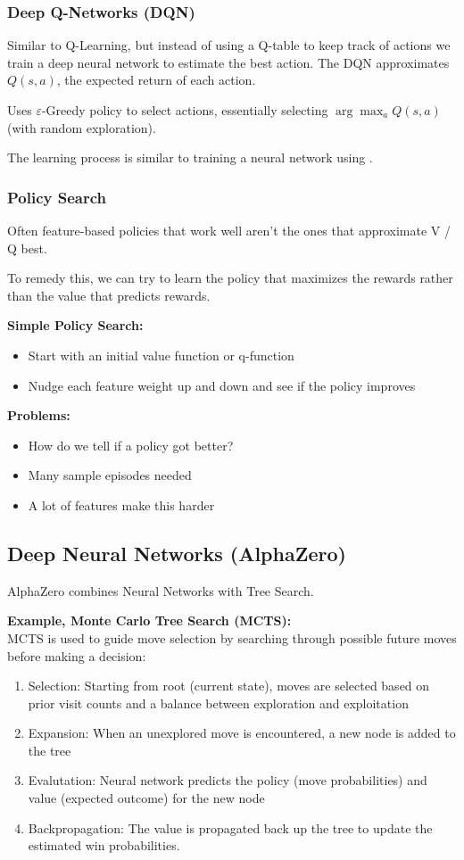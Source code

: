 \documentclass[
../EiKI_Summary.tex,
]
{subfiles}
\begin{document}
\subsubsection{Deep Q-Networks (DQN)}
Similar to Q-Learning, but instead of using a Q-table to keep track of actions we train a deep neural network to estimate the best action. The DQN approximates $Q(s,a)$, the expected return of each action.

Uses $\varepsilon$-Greedy policy to select actions, essentially selecting $\arg \max_a Q(s,a)$ (with random exploration). 

The learning process is similar to training a neural network using .


\subsubsection{Policy Search}
Often feature-based policies that work well aren't the ones that approximate V / Q best. 

To remedy this, we can try to learn the policy that maximizes the rewards rather than the value that predicts rewards.

\textbf{Simple Policy Search:}
\begin{itemize}
    \item Start with an initial value function or q-function
    \item Nudge each feature weight up and down and see if the policy improves
\end{itemize}

\textbf{Problems:}
\begin{itemize}
    \item How do we tell if a policy got better?
    \item Many sample episodes needed
    \item A lot of features make this harder
\end{itemize}

\subsection{Deep Neural Networks (AlphaZero)}
AlphaZero combines Neural Networks with Tree Search. 

\textbf{Example, Monte Carlo Tree Search (MCTS):}\\
MCTS is used to guide move selection by searching through possible future moves before making a decision:
\begin{enumerate}
    \item Selection: Starting from root (current state), moves are selected based on prior visit counts and a balance between exploration and exploitation
    \item Expansion: When an unexplored move is encountered, a new node is added to the tree
    \item Evalutation: Neural network predicts the policy (move probabilities) and value (expected outcome) for the new node
    \item Backpropagation: The value is propagated back up the tree to update the estimated win probabilities.
\end{enumerate}
\end{document}

